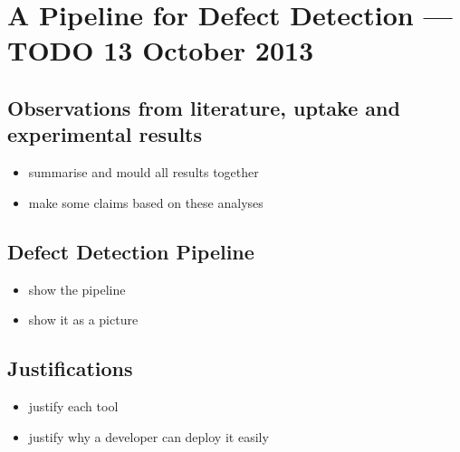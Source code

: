 \section{A Pipeline for Defect Detection --- TODO 13 October 2013}

\subsection{Observations from literature, uptake and experimental results}

\begin{itemize}
  \item summarise and mould all results together
  \item make some claims based on these analyses
\end{itemize}

\subsection{Defect Detection Pipeline}

\begin{itemize}
  \item show the pipeline
  \item show it as a picture
\end{itemize}

\subsection{Justifications}

\begin{itemize}
  \item justify each tool
  \item justify why a developer can deploy it easily
\end{itemize}
